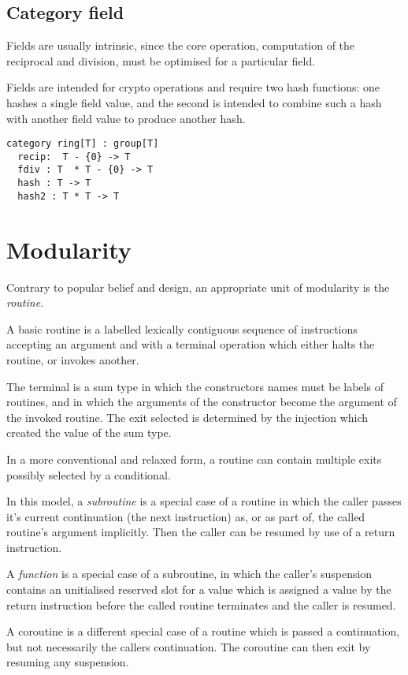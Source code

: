 \documentclass[oneside]{book}
\theoremstyle{plain}
\theoremstyle{definition}
\theoremstyle{plain}
\begin{document}
\section{Category field}
Fields are usually intrinsic, since the core operation, computation
of the reciprocal and division, must be optimised for a particular
field.

Fields are intended for crypto operations and require two hash functions:
one hashes a single field value, and the second is intended to combine 
such a hash with another field value to produce another hash.

\begin{verbatim}
category ring[T] : group[T]
  recip:  T - {0} -> T
  fdiv : T  * T - {0} -> T
  hash : T -> T
  hash2 : T * T -> T
\end{verbatim}


\chapter{Modularity}
Contrary to popular belief and design, an appropriate unit of modularity
is the {\em routine.}

A basic routine is a labelled lexically contiguous sequence of instructions
accepting an argument and with a terminal operation which either halts
the routine, or invokes another.

The terminal is a sum type in which the constructors names must be labels
of routines, and in which the arguments of the constructor become the
argument of the invoked routine.  The exit selected is determined by
the injection which created the value of the sum type.

In a more conventional and relaxed form, a routine can contain multiple
exits possibly selected by a conditional.

In this model, a {\em subroutine} is a special case of a routine in which
the caller passes it's current continuation (the next instruction) as, or as
part of, the called routine's argument implicitly. Then the caller can be resumed
by use of a return instruction.

A {\em function} is a special case of a subroutine, in which the caller's suspension
contains an unitialised reserved slot for a value which is assigned a value
by the return instruction before the called routine terminates and the caller
is resumed.

A coroutine is a different special case of a routine which is passed a continuation,
but not necessarily the callers continuation. The coroutine can then exit by
resuming any suspension.
\end{document}
